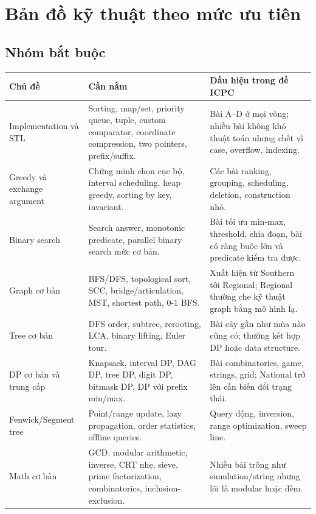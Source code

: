 \documentclass[11pt,a4paper]{article}
\begin{document}
\section{Bản đồ kỹ thuật theo mức ưu tiên}

\subsection{Nhóm bắt buộc}

\begin{longtable}{p{3.1cm}p{5.0cm}p{6.1cm}}
\toprule
\textbf{Chủ đề} & \textbf{Cần nắm} & \textbf{Dấu hiệu trong đề ICPC}\\
\midrule
Implementation và STL & Sorting, map/set, priority queue, tuple, custom comparator, coordinate compression, two pointers, prefix/suffix. & Bài A--D ở mọi vòng; nhiều bài không khó thuật toán nhưng chết vì case, overflow, indexing.\\
\addlinespace
Greedy và exchange argument & Chứng minh chọn cục bộ, interval scheduling, heap greedy, sorting by key, invariant. & Các bài ranking, grouping, scheduling, deletion, construction nhỏ.\\
\addlinespace
Binary search & Search answer, monotonic predicate, parallel binary search mức cơ bản. & Bài tối ưu min-max, threshold, chia đoạn, bài có ràng buộc lớn và predicate kiểm tra được.\\
\addlinespace
Graph cơ bản & BFS/DFS, topological sort, SCC, bridge/articulation, MST, shortest path, 0-1 BFS. & Xuất hiện từ Southern tới Regional; Regional thường che kỹ thuật graph bằng mô hình lạ.\\
\addlinespace
Tree cơ bản & DFS order, subtree, rerooting, LCA, binary lifting, Euler tour. & Bài cây gần như mùa nào cũng có; thường kết hợp DP hoặc data structure.\\
\addlinespace
DP cơ bản và trung cấp & Knapsack, interval DP, DAG DP, tree DP, digit DP, bitmask DP, DP với prefix min/max. & Bài combinatorics, game, strings, grid; National trở lên cần biến đổi trạng thái.\\
\addlinespace
Fenwick/Segment tree & Point/range update, lazy propagation, order statistics, offline queries. & Query động, inversion, range optimization, sweep line.\\
\addlinespace
Math cơ bản & GCD, modular arithmetic, inverse, CRT nhẹ, sieve, prime factorization, combinatorics, inclusion-exclusion. & Nhiều bài trông như simulation/string nhưng lõi là modular hoặc đếm.\\
\bottomrule
\end{longtable}
\end{document}
